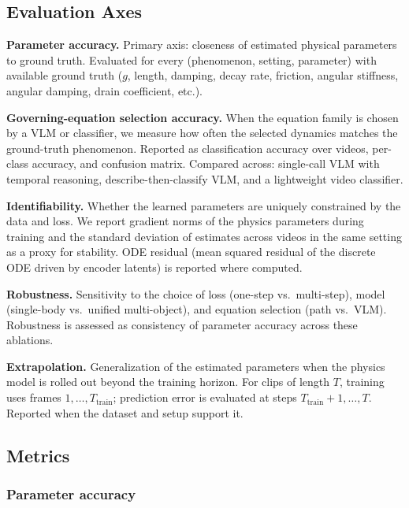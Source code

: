 \subsection{Evaluation Axes}
\label{sec:eval_axes}

\textbf{Parameter accuracy.} Primary axis: closeness of estimated physical parameters to ground truth. Evaluated for every (phenomenon, setting, parameter) with available ground truth ($g$, length, damping, decay rate, friction, angular stiffness, angular damping, drain coefficient, etc.).

\textbf{Governing-equation selection accuracy.} When the equation family is chosen by a VLM or classifier, we measure how often the selected dynamics matches the ground-truth phenomenon. Reported as classification accuracy over videos, per-class accuracy, and confusion matrix. Compared across: single-call VLM with temporal reasoning, describe-then-classify VLM, and a lightweight video classifier.

\textbf{Identifiability.} Whether the learned parameters are uniquely constrained by the data and loss. We report gradient norms of the physics parameters during training and the standard deviation of estimates across videos in the same setting as a proxy for stability. ODE residual (mean squared residual of the discrete ODE driven by encoder latents) is reported where computed.

\textbf{Robustness.} Sensitivity to the choice of loss (one-step vs.\ multi-step), model (single-body vs.\ unified multi-object), and equation selection (path vs.\ VLM). Robustness is assessed as consistency of parameter accuracy across these ablations.

\textbf{Extrapolation.} Generalization of the estimated parameters when the physics model is rolled out beyond the training horizon. For clips of length $T$, training uses frames $1, \ldots, T_{\mathrm{train}}$; prediction error is evaluated at steps $T_{\mathrm{train}}+1, \ldots, T$. Reported when the dataset and setup support it.

\subsection{Metrics}
\label{sec:metrics}

\subsubsection{Parameter accuracy}
\label{sec:metrics_param}

